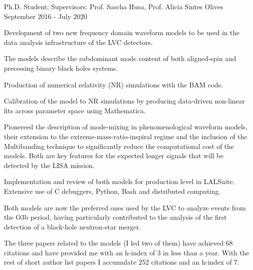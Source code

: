 \begin{cventries}
  \cventry
    {Ph.D. Student; Supervisors: Prof. Sascha Husa, Prof. Alicia Sintes Olives}
    {}
    {}
    {September 2016 - July 2020}
    {
      \begin{cvitems}
        \item {Development of two new frequency domain waveform models to be used in the data analysis infrastructure of the LVC detectors.}
        \item {The models describe the subdominant mode content of both aligned-spin and precessing binary black holes systems.}
        \item {Production of numerical relativity (NR) simulations with the BAM code.}
        \item {Calibration of the model to NR simulations by producing data-driven non-linear fits across parameter space using Mathematica.}
        \item {Pionereed the description of mode-mixing in phenomenological waveform models, their extension to the extreme-mass-ratio-inspiral regime and the inclusion of the Multibanding technique to significantly reduce the computational cost of the models. Both are key features for the expected longer signals that will be detected by the LISA mission.}
        \item {Implementation and review of both models for production level in LALSuite. Extensive use of C debuggers, Python, Bash and distributed computing.}
        \item {Both models are now the preferred ones used by the LVC to analyze events from the O3b period, having particularly contributed to the analysis of the first detection of a black-hole neutron-star merger.}
        \item {The three papers related to the models (I led two of them) have achieved 68 citations and have provided me with an h-index of 3 in less than a year. With the rest of short author list papers I accumulate 252 citations and an h-index of 7.  }
      \end{cvitems} 
    }\vspace{-10pt}


\end{cventries}
